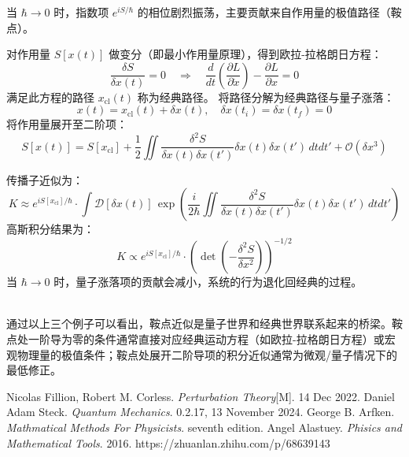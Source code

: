 \documentclass[12pt, a4paper, oneside]{ctexart}
\begin{document}
当 \(\hbar \to 0\) 时，指数项 \( e^{i S/\hbar} \) 的相位剧烈振荡，主要贡献来自作用量的极值路径（鞍点）。

对作用量 \( S[x(t)] \) 做变分（即最小作用量原理），得到欧拉-拉格朗日方程：
    \[
    \frac{\delta S}{\delta x(t)} = 0 \quad \Rightarrow \quad \frac{d}{dt} \left( \frac{\partial L}{\partial \dot{x}} \right) - \frac{\partial L}{\partial x} = 0
    \]
    满足此方程的路径 \( x_{\text{cl}}(t) \) 称为经典路径。
将路径分解为经典路径与量子涨落：
\[
x(t) = x_{\text{cl}}(t) + \delta x(t), \quad \delta x(t_i) = \delta x(t_f) = 0
\]
将作用量展开至二阶项：
\[
S[x(t)] = S[x_{\text{cl}}] + \frac{1}{2} \iint \frac{\delta^2 S}{\delta x(t) \delta x(t')} \delta x(t) \delta x(t') \, dt dt' + \mathcal{O}(\delta x^3)
\]

传播子近似为：
\[
K \approx e^{i S[x_{\text{cl}}]/\hbar} \cdot \int \mathcal{D}[\delta x(t)] \, \exp\left( \frac{i}{2\hbar} \iint \frac{\delta^2 S}{\delta x(t)\delta x(t')} \delta x(t) \delta x(t') \, dt dt' \right)
\]
高斯积分结果为：
\[
K \propto e^{i S[x_{\text{cl}}]/\hbar} \cdot \left( \det \left( -\frac{\delta^2 S}{\delta x^2} \right) \right)^{-1/2}
\]
当 \(\hbar \to 0\) 时，量子涨落项的贡献会减小，系统的行为退化回经典的过程。

\qquad\\
通过以上三个例子可以看出，鞍点近似是量子世界和经典世界联系起来的桥梁。鞍点处一阶导为零的条件通常直接对应经典运动方程（如欧拉-拉格朗日方程）或宏观物理量的极值条件；鞍点处展开二阶导项的积分近似通常为微观/量子情况下的最低修正。
\newpage

\begin{thebibliography}{99}
    Nicolas Fillion, Robert M. Corless. \emph{Perturbation Theory}[M]. 14 Dec 2022.
    Daniel Adam Steck. \emph{Quantum Mechanics}.  0.2.17, 13 November 2024.
     George B. Arfken. \emph{Mathmatical Methods For Physicists}.   seventh edition.
    Angel Alastuey. \emph{Phisics and Mathematical Tools}. 2016.
    https://zhuanlan.zhihu.com/p/68639143
\end{thebibliography}
\end{document}
